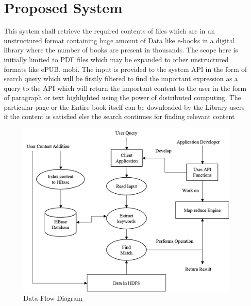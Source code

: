 \documentclass{IEEEtran}
\begin{document}
\section{Proposed System}
This system shall retrieve the required contents of files which are in an unstructured format containing huge amount of Data like e-books in a digital library where the number of books are present in thousands. The scope here is initially limited to PDF files which may be expanded to other unstructured formats like ePUB, mobi. The input is provided to the system API in the form of search query which will be firstly filtered to find the important expression as a query to the API which will return the important content to the user in the form of paragraph or text highlighted using the power of distributed computing. The particular page or the Entire book itself can be downloaded by the Library users if the content is satisfied else the search continues for finding relevant content 

\begin{figure}[h]
\includegraphics{data_flow}
\caption{Data Flow Diagram}
\end{figure}
\end{document}
